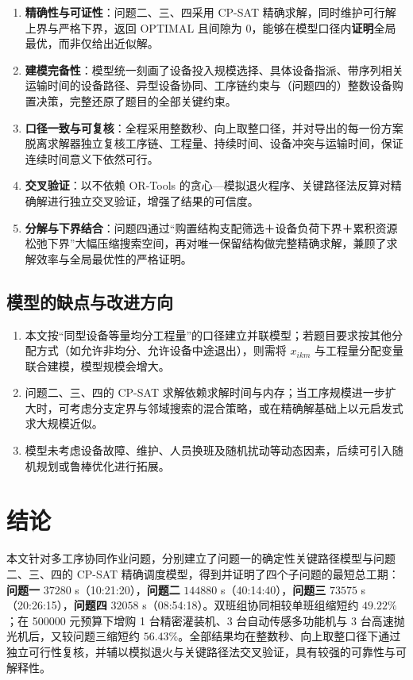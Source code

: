 \documentclass[12pt,a4paper]{article}
\begin{document}
\begin{enumerate}[label=\textbf{(\arabic*)}]
  \item \textbf{精确性与可证性}：问题二、三、四采用 CP-SAT 精确求解，同时维护可行解上界与严格下界，返回 OPTIMAL 且间隙为 0，能够在模型口径内\textbf{证明}全局最优，而非仅给出近似解。
  \item \textbf{建模完备性}：模型统一刻画了设备投入规模选择、具体设备指派、带序列相关运输时间的设备路径、异型设备协同、工序链约束与（问题四的）整数设备购置决策，完整还原了题目的全部关键约束。
  \item \textbf{口径一致与可复核}：全程采用整数秒、向上取整口径，并对导出的每一份方案脱离求解器独立复核工序链、工程量、持续时间、设备冲突与运输时间，保证连续时间意义下依然可行。
  \item \textbf{交叉验证}：以不依赖 OR-Tools 的贪心—模拟退火程序、关键路径法反算对精确解进行独立交叉验证，增强了结果的可信度。
  \item \textbf{分解与下界结合}：问题四通过“购置结构支配筛选＋设备负荷下界＋累积资源松弛下界”大幅压缩搜索空间，再对唯一保留结构做完整精确求解，兼顾了求解效率与全局最优性的严格证明。
\end{enumerate}

\subsection{模型的缺点与改进方向}

\begin{enumerate}[label=\textbf{(\arabic*)}]
  \item 本文按“同型设备等量均分工程量”的口径建立并联模型；若题目要求按其他分配方式（如允许非均分、允许设备中途退出），则需将 $x_{ikm}$ 与工程量分配变量联合建模，模型规模会增大。
  \item 问题二、三、四的 CP-SAT 求解依赖求解时间与内存；当工序规模进一步扩大时，可考虑分支定界与邻域搜索的混合策略，或在精确解基础上以元启发式求大规模近似。
  \item 模型未考虑设备故障、维护、人员换班及随机扰动等动态因素，后续可引入随机规划或鲁棒优化进行拓展。
\end{enumerate}

\section{结论}

本文针对多工序协同作业问题，分别建立了问题一的确定性关键路径模型与问题二、三、四的 CP-SAT 精确调度模型，得到并证明了四个子问题的最短总工期：\textbf{问题一} $37280$ s（10:21:20），\textbf{问题二} $144880$ s（40:14:40），\textbf{问题三} $73575$ s（20:26:15），\textbf{问题四} $32058$ s（08:54:18）。双班组协同相较单班组缩短约 $49.22\%$；在 500000 元预算下增购 1 台精密灌装机、3 台自动传感多功能机与 3 台高速抛光机后，又较问题三缩短约 $56.43\%$。全部结果均在整数秒、向上取整口径下通过独立可行性复核，并辅以模拟退火与关键路径法交叉验证，具有较强的可靠性与可解释性。
\end{document}

